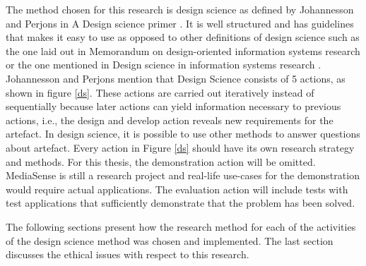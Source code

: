 The method chosen for this research is design science as defined by Johannesson and Perjons in A Design science primer \cite{johannesson2012design}. It is well structured and has guidelines that makes it easy to use as opposed to other definitions of design science such as the one laid out in Memorandum on design-oriented information systems research \cite{osterle2010memorandum} or the one mentioned in Design science in information systems research \cite{hevner2004design}. Johannesson and Perjons mention that Design Science consists of 5 actions, as shown in figure \ref{ds}. These actions are carried out iteratively instead of sequentially because later actions can yield information necessary to previous actions, i.e., the design and develop action reveals new requirements for the artefact. In design science, it is possible to use other methods to answer questions about artefact. Every action in Figure \ref{ds} should have its own research strategy and methods. For this thesis, the demonstration action will be omitted. MediaSense is still a research project and real-life use-cases for the demonstration would require actual applications. The evaluation action will include tests with test applications that sufficiently demonstrate that the problem has been solved.

The following sections present how the research method for each of the activities of the design science method was chosen and implemented. The last section discusses the ethical issues with respect to this research.







